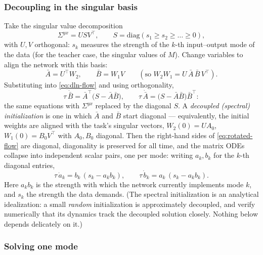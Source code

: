 \documentclass[11pt]{article}
\begin{document}
\subsubsection{Decoupling in the singular basis}

Take the singular value decomposition
\begin{equation}
  \label{eq:svd}
  \Sigma^{yx} = U S V^{\top},
  \qquad S = \mathrm{diag}(s_1 \ge s_2 \ge \dots \ge 0),
\end{equation}
with $U, V$ orthogonal: $s_k$ measures the strength of the $k$-th
input--output mode of the data (for the teacher case, the singular values
of $M$). Change variables to align the network with this basis:
\begin{equation}
  \label{eq:rotated-vars}
  \bar A = U^{\top} W_2, \qquad \bar B = W_1 V
  \qquad (\text{so } W_2 W_1 = U\,\bar A\,\bar B\,V^{\top}).
\end{equation}
Substituting into \cref{eq:dln-flow} and using orthogonality,
\begin{equation}
  \label{eq:rotated-flow}
  \tau\,\dot{\bar B} = \bar A^{\top}\bigl(S - \bar A \bar B\bigr),
  \qquad
  \tau\,\dot{\bar A} = \bigl(S - \bar A \bar B\bigr)\bar B^{\top} :
\end{equation}
the same equations with $\Sigma^{yx}$ replaced by the diagonal $S$. A
\emph{decoupled (spectral) initialization} is one in which $\bar A$ and
$\bar B$ start diagonal --- equivalently, the initial weights are aligned
with the task's singular vectors, $W_2(0) = U A_0$, $W_1(0) = B_0
V^{\top}$ with $A_0, B_0$ diagonal. Then the right-hand sides of
\cref{eq:rotated-flow} are diagonal, diagonality is preserved for all time,
and the matrix ODEs collapse into independent scalar pairs, one per mode:
writing $a_k, b_k$ for the $k$-th diagonal entries,
\begin{equation}
  \label{eq:mode-odes}
  \tau\,\dot a_k = b_k\,(s_k - a_k b_k),
  \qquad
  \tau\,\dot b_k = a_k\,(s_k - a_k b_k).
\end{equation}
Here $a_k b_k$ is the strength with which the network currently implements
mode $k$, and $s_k$ the strength the data demands. (The spectral
initialization is an analytical idealization: a small \emph{random}
initialization is approximately decoupled, and \cite{saxe2014exact} verify
numerically that its dynamics track the decoupled solution closely. Nothing
below depends delicately on it.)

\subsubsection{Solving one mode}
\end{document}
